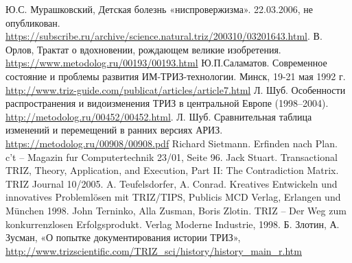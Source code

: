 \begin{thebibliography}{xxx}
 Ю.С. Мурашковский, Детская болезнь
  «ниспровержизма». 22.03.2006, не опубликован.
  \url{https://subscribe.ru/archive/science.natural.triz/200310/03201643.html}.
 В. Орлов, Трактат о вдохновении, рождающем великие
  изобретения.  \url{https://www.metodolog.ru/00193/00193.html}
 Ю.П.Саламатов. Современное состояние и проблемы
  развития ИМ-ТРИЗ-технологии. Минск, 19-21 мая 1992 г.
  \url{http://www.triz-guide.com/publicat/articles/article7.html}
 Л. Шуб. Особенности распространения и видоизменения ТРИЗ в
  центральной Европе (1998--2004).
  \url{http://metodolog.ru/00452/00452.html}.
 Л. Шуб. Сравнительная таблица изменений и перемещений в
  ранних версиях АРИЗ. \url{https://metodolog.ru/00908/00908.pdf}
 Richard Sietmann. Erfinden nach Plan. c't -- Magazin
  fur Computertechnik 23/01, Seite 96.
 Jack Stuart. Transactional TRIZ, Theory, Application, and
  Execution, Part II: The Contradiction Matrix. TRIZ Journal 10/2005.
 A. Teufelsdorfer, A.  Conrad. Kreatives Entwickeln
  und innovatives Problemlösen mit TRIZ/TIPS, Publicis MCD Verlag, Erlangen
  und München 1998.
 John Terninko, Alla Zusman, Boris Zlotin. TRIZ -- Der
  Weg zum konkurrenzlosen Erfolgsprodukt. Verlag Moderne Industrie, 1998.
 Б. Злотин, А. Зусман, «О попытке документирования
  истории ТРИЗ»,
  \url{http://www.trizscientific.com/TRIZ_sci/history/history_main_r.htm}
\end{thebibliography}

